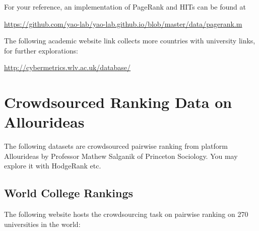 \documentclass[11pt]{article}
\begin{document}
For your reference, an implementation of PageRank and HITs can be found at 

\url{https://github.com/yao-lab/yao-lab.github.io/blob/master/data/pagerank.m}

The following academic website link collects more countries with university links, for further explorations:

\url{http://cybermetrics.wlv.ac.uk/database/} 



\section{Crowdsourced Ranking Data on Allourideas}
The following datasets are crowdsourced pairwise ranking from platform Allourideas by Professor Mathew Salganik of Princeton Sociology. You may explore it with HodgeRank etc. 

%
%
%
%
%

\subsection{World College Rankings}
The following website hosts the crowdsourcing task on pairwise ranking on 270 universities in the world:
\end{document}
